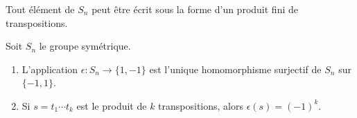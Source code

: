 \begin{proposition} \label{PropPWIJbu}
    Tout élément de \( S_n\) peut être écrit sous la forme d'un produit fini de transpositions.
\end{proposition}

\begin{proposition}  \label{ProphIuJrC}
    Soit \( S_n\) le groupe symétrique.
    \begin{enumerate}
        \item
            L'application \( \epsilon\colon S_n\to \{ 1,-1 \}\) est l'unique homomorphisme surjectif de \( S_n\) sur \( \{ -1,1 \}\).
        \item
            Si \( s=t_1\cdots t_k\) est le produit de \( k\) transpositions, alors \( \epsilon(s)=(-1)^k\).
    \end{enumerate}
\end{proposition}

